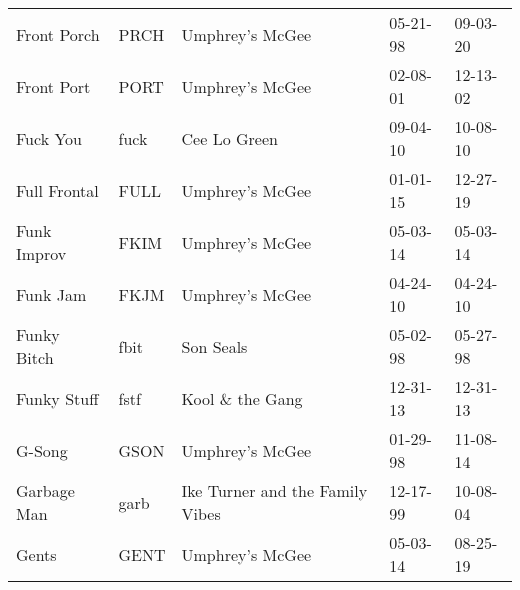 \begin{longtable}{p{}p{}p{}p{}p{}}
                                                             Front Porch &          PRCH &                                          Umphrey's McGee &              05-21-98 &             09-03-20 \\
                                                              Front Port &          PORT &                                          Umphrey's McGee &              02-08-01 &             12-13-02 \\
                                                                Fuck You &          fuck &                                             Cee Lo Green &              09-04-10 &             10-08-10 \\
                                                            Full Frontal &          FULL &                                          Umphrey's McGee &              01-01-15 &             12-27-19 \\
                                                             Funk Improv &          FKIM &                                          Umphrey's McGee &              05-03-14 &             05-03-14 \\
                                                                Funk Jam &          FKJM &                                          Umphrey's McGee &              04-24-10 &             04-24-10 \\
                                                             Funky Bitch &          fbit &                                                Son Seals &              05-02-98 &             05-27-98 \\
                                                             Funky Stuff &          fstf &                                         Kool \& the Gang &              12-31-13 &             12-31-13 \\
                                                                  G-Song &          GSON &                                          Umphrey's McGee &              01-29-98 &             11-08-14 \\
                                                             Garbage Man &          garb &                          Ike Turner and the Family Vibes &              12-17-99 &             10-08-04 \\
                                                                   Gents &          GENT &                                          Umphrey's McGee &              05-03-14 &             08-25-19 \\

\end{longtable}
